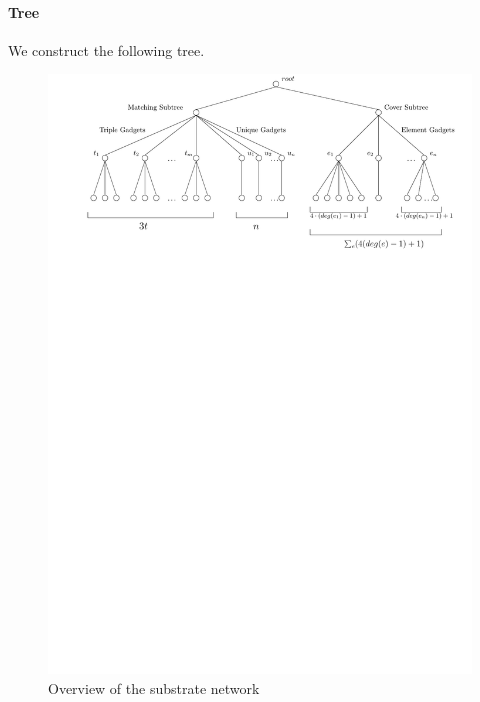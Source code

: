 \documentclass[preprint,12pt]{elsarticle}
\begin{document}
\paragraph{Tree}

We construct the following tree.

\begin{figure}[t]
  \centering
  \includegraphics[width=0.99\columnwidth]{reduction/overview.pdf}
  \vspace{-1em}
  \caption{Overview of the substrate network}
  \vspace{-1em}
\end{figure}
\end{document}
